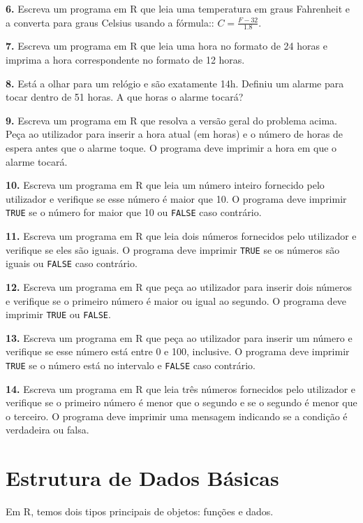 \documentclass[
]{book}
\begin{document}
\textbf{6.} Escreva um programa em R que leia uma temperatura em graus
Fahrenheit e a converta para graus Celsius usando a fórmula::
\(C = \frac{F - 32}{1.8}\).

\textbf{7.} Escreva um programa em R que leia uma hora no formato de 24 horas
e imprima a hora correspondente no formato de 12 horas.

\textbf{8.} Está a olhar para um relógio e são exatamente 14h. Definiu um
alarme para tocar dentro de 51 horas. A que horas o alarme tocará?

\textbf{9.} Escreva um programa em R que resolva a versão geral do problema
acima. Peça ao utilizador para inserir a hora atual (em horas) e o
número de horas de espera antes que o alarme toque. O programa deve
imprimir a hora em que o alarme tocará.

\textbf{10.} Escreva um programa em R que leia um número inteiro fornecido
pelo utilizador e verifique se esse número é maior que 10. O programa
deve imprimir \texttt{TRUE} se o número for maior que 10 ou \texttt{FALSE} caso
contrário.

\textbf{11.} Escreva um programa em R que leia dois números fornecidos pelo
utilizador e verifique se eles são iguais. O programa deve imprimir
\texttt{TRUE} se os números são iguais ou \texttt{FALSE} caso contrário.

\textbf{12.} Escreva um programa em R que peça ao utilizador para inserir
dois números e verifique se o primeiro número é maior ou igual ao
segundo. O programa deve imprimir \texttt{TRUE} ou \texttt{FALSE}.

\textbf{13.} Escreva um programa em R que peça ao utilizador para inserir um
número e verifique se esse número está entre 0 e 100, inclusive. O
programa deve imprimir \texttt{TRUE} se o número está no intervalo e \texttt{FALSE}
caso contrário.

\textbf{14.} Escreva um programa em R que leia três números fornecidos pelo
utilizador e verifique se o primeiro número é menor que o segundo e se o
segundo é menor que o terceiro. O programa deve imprimir uma mensagem
indicando se a condição é verdadeira ou falsa.

\chapter{Estrutura de Dados Básicas}\label{estrutura-de-dados-buxe1sicas}

Em R, temos dois tipos principais de objetos: funções e dados.
\end{document}
